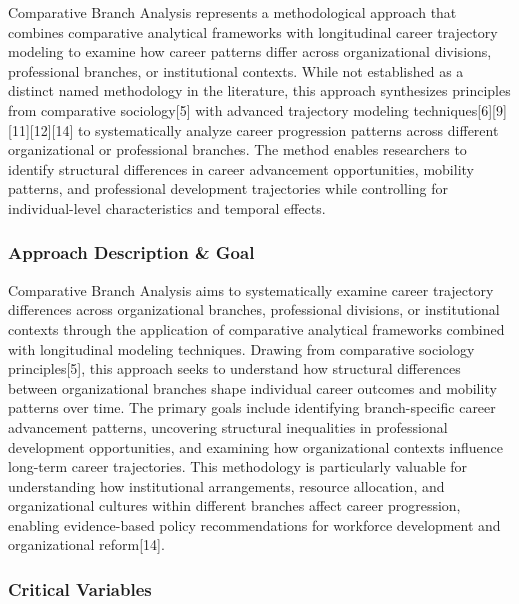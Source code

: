 \documentclass[main.tex]{subfiles}
\begin{document}
Comparative Branch Analysis represents a methodological approach that combines comparative analytical frameworks with longitudinal career trajectory modeling to examine how career patterns differ across organizational divisions, professional branches, or institutional contexts. While not established as a distinct named methodology in the literature, this approach synthesizes principles from comparative sociology[5] with advanced trajectory modeling techniques[6][9][11][12][14] to systematically analyze career progression patterns across different organizational or professional branches. The method enables researchers to identify structural differences in career advancement opportunities, mobility patterns, and professional development trajectories while controlling for individual-level characteristics and temporal effects.

\subsubsection{Approach Description \& Goal}

Comparative Branch Analysis aims to systematically examine career trajectory differences across organizational branches, professional divisions, or institutional contexts through the application of comparative analytical frameworks combined with longitudinal modeling techniques. Drawing from comparative sociology principles[5], this approach seeks to understand how structural differences between organizational branches shape individual career outcomes and mobility patterns over time. The primary goals include identifying branch-specific career advancement patterns, uncovering structural inequalities in professional development opportunities, and examining how organizational contexts influence long-term career trajectories. This methodology is particularly valuable for understanding how institutional arrangements, resource allocation, and organizational cultures within different branches affect career progression, enabling evidence-based policy recommendations for workforce development and organizational reform[14].

\subsubsection{Critical Variables}
\end{document}
